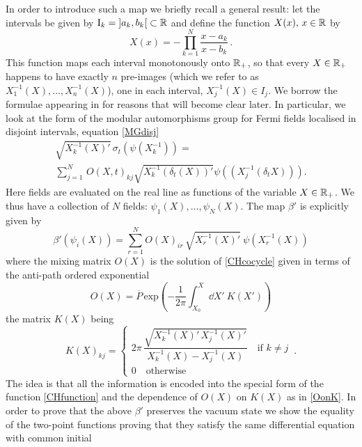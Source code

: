 \bigskip 
In order to introduce such a map we briefly recall a 
general result: let the intervals be given by 
$\textrm{I}_k=\mathopen{]}a_k,b_k\mathclose{[} \subset \mathbb{R}$ and define 
the function $X(x),\,x\in \mathbb{R}$ by
\begin{equation}
\label{CHfunction}
X(x) = - \prod_{k=1}^N \frac{x-a_k}{x-b_k}\,.
\end{equation}
This function maps each interval monotonously onto $\mathbb{R}_+$, 
so that every $X\in \mathbb{R}_+$ happens to have exactly $n$ 
pre-images (which we refer to as $X_1^{-1}(X),\ldots,X_n^{-1}(X)$), 
one in each interval, $X_j^{-1}(X) \in I_j$.
We borrow the formulae appearing in \cite{CH:2009} 
for reasons that will become clear later. 
In particular, we look at the 
form of the modular automorphisms group for Fermi fields
localised in disjoint intervals, equation \eqref{MGdisj}
 \begin{multline*}
 \sqrt{{X_k^{-1}(X)}'}\,\sigma_t\left(\psi(X_k^{-1})\right)=\\
 \sum_{j=1}^N\,O(X,t)_{kj}\sqrt{{X_k^{-1}(\delta_t(X))}'}
 \psi\left((X_j^{-1}(\delta_t X))\right).
 \end{multline*}
Here fields are evaluated on the real line as functions 
of the variable $X\in\mathbb{R}_+$. We thus have a collection 
of $N$ fields: $\psi_1(X),\ldots,\psi_N(X)$. The 
map $\beta'$ is explicitly given by
\begin{equation}
\label{map_beta_general}
\beta'(\psi_i(X))= \sum_{r=1}^N {O(X)}_{ir}\,\sqrt{{X_r^{-1}(X)}'}\ 
\psi(X_r^{-1}(X))
\end{equation}
where the mixing matrix $O(X)$ is the solution of 
\eqref{CHcocycle} given in terms of the anti-path
ordered exponential
\begin{equation}
\label{OonK}
O(X)=\overline{P}\,\textrm{exp} \left(-\frac{1}{2\pi}
\int_{X_0}^X \dd X'\ K(X')\right)
\end{equation}
the matrix $K(X)$ being 
\[
{K(X)}_{kj}=
 \begin{cases}
 2\pi\,\dfrac{\sqrt{{X_k^{-1}(X)}'\,{X_j^{-1}(X)}'}}
 {{X_k^{-1}(X)} - {X_j^{-1}(X)}}\quad\mbox{if } k\neq j\\
 0\quad\mbox{otherwise}
 \end{cases}\,.
\]
The idea is that all the information is encoded into the special
form of the function \eqref{CHfunction} and the dependence
of $O(X)$ on $K(X)$ as in \eqref{OonK}. In order to prove that
the above $\beta'$ preserves the vacuum state we  
show the equality of the two-point functions proving that
they satisfy the same differential equation with common initial
